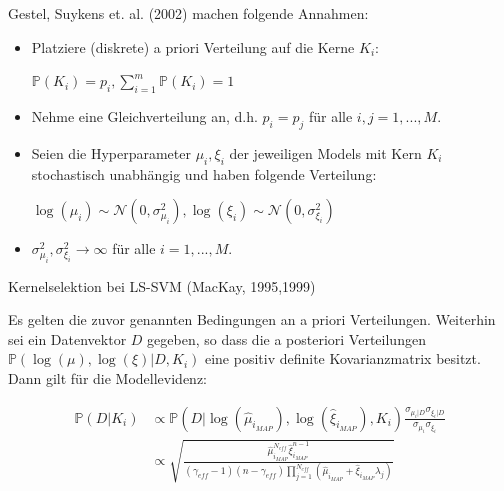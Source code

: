 \documentclass{beamer}
\begin{document}
{\begin{frame}
Gestel, Suykens et. al. (2002) machen folgende Annahmen:
\begin{itemize}
	\item Platziere (diskrete) a priori Verteilung auf die Kerne $K_i$:
		\begin{center}
			$\mathbb{P}(K_i) = p_i, \sum_{i=1}^{m} \mathbb{P}(K_i) = 1$
		\end{center}
	\item Nehme eine Gleichverteilung an, d.h. $p_i = p_j$ für alle $i,j = 1,...,M$.
	\pause
	\item Seien die Hyperparameter $\mu_i, \xi_i$ der jeweiligen Models mit Kern $K_i$ 				  stochastisch unabhängig und haben folgende Verteilung:
		  \begin{center}
				$\log(\mu_i) \sim \mathcal{N}(0, \sigma_{\mu_i}^2), \log(\xi_i) \sim 						\mathcal{N}(0, \sigma_{\xi_i}^2)$ 
		  \end{center}
	\item $\sigma_{\mu_i}^2, \sigma_{\xi_i}^2 \rightarrow \infty$ für alle $i = 1,...,M				   $.
\end{itemize}
\end{frame}






\begin{frame}

\begin{block}{Kernelselektion bei LS-SVM (MacKay, 1995,1999)}

Es gelten die zuvor genannten Bedingungen an a priori Verteilungen. Weiterhin sei ein Datenvektor $D$ gegeben, so dass die a posteriori Verteilungen $\mathbb{P}(\log(\mu),\log(\xi) \vert D, K_i)$ eine positiv definite Kovarianzmatrix besitzt. Dann gilt für die Modellevidenz:


\begin{align}
\mathbb{P}(D \vert K_i) & \propto \mathbb{P}(D \vert \log(\hat{\mu}_{i_{MAP}}), \log(\hat{\xi}_{i_{MAP}}), K_i)\frac{\sigma_{\mu_i\vert D} \sigma_{\xi_i\vert D}}{\sigma_{\mu_i} \sigma_{\xi_i}}\\
&\propto \sqrt{\frac{\hat{\mu}^{N_{eff}}_{i_{MAP}} \hat{\xi}^{n-1}_{i_{MAP}}}{(\gamma_{eff}-1)(n - \gamma_{eff}) \prod_{j=1}^{N_{eff}}(\hat{\mu}_{i_{MAP}} + \hat{\xi}_{i_{MAP}}\lambda_j)}}
\end{align}


\end{block}
\end{frame}}
\end{document}
